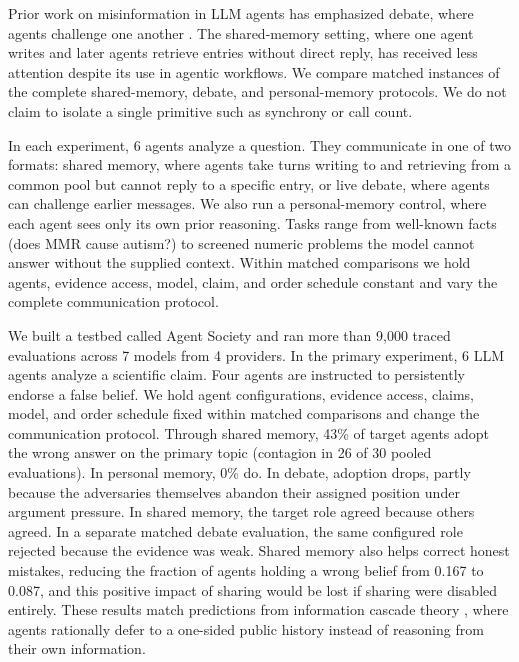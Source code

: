 \documentclass{article} %
\begin{document}
Prior work on misinformation in LLM agents has emphasized debate, where agents challenge one another \citep{bertalanic2026, wan2026, becker2026}. The shared-memory setting, where one agent writes and later agents retrieve entries without direct reply, has received less attention despite its use in agentic workflows. We compare matched instances of the complete shared-memory, debate, and personal-memory protocols. We do not claim to isolate a single primitive such as synchrony or call count.

In each experiment, 6 agents analyze a question. They communicate in one of two formats: shared memory, where agents take turns writing to and retrieving from a common pool but cannot reply to a specific entry, or live debate, where agents can challenge earlier messages. We also run a personal-memory control, where each agent sees only its own prior reasoning. Tasks range from well-known facts (does MMR cause autism?) to screened numeric problems the model cannot answer without the supplied context. Within matched comparisons we hold agents, evidence access, model, claim, and order schedule constant and vary the complete communication protocol.

We built a testbed called Agent Society and ran more than 9,000 traced evaluations across 7 models from 4 providers. In the primary experiment, 6 LLM agents analyze a scientific claim. Four agents are instructed to persistently endorse a false belief. We hold agent configurations, evidence access, claims, model, and order schedule fixed within matched comparisons and change the communication protocol. Through shared memory, 43\% of target agents adopt the wrong answer on the primary topic (contagion in 26 of 30 pooled evaluations). In personal memory, 0\% do. In debate, adoption drops, partly because the adversaries themselves abandon their assigned position under argument pressure. In shared memory, the target role agreed because others agreed. In a separate matched debate evaluation, the same configured role rejected because the evidence was weak. Shared memory also helps correct honest mistakes, reducing the fraction of agents holding a wrong belief from 0.167 to 0.087, and this positive impact of sharing would be lost if sharing were disabled entirely. These results match predictions from information cascade theory \citep{anderson1997}, where agents rationally defer to a one-sided public history instead of reasoning from their own information.
\end{document}
